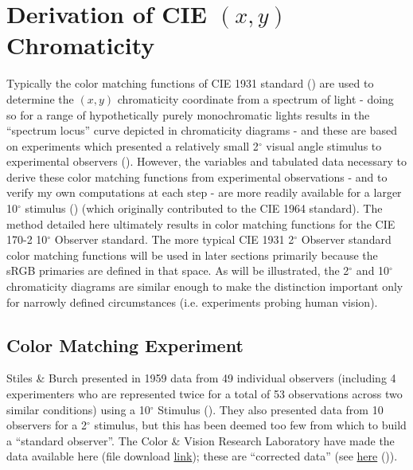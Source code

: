 \documentclass{article}
\begin{document}

\section{Derivation of CIE $(x,y)$ Chromaticity} \label{sec:derivation}

\begin{multicols}{2}


Typically the color matching functions of CIE 1931 standard (\cite{cie1932commission}) are used to determine the $(x,y)$ chromaticity coordinate from a spectrum of light - doing so for a range of hypothetically purely monochromatic lights results in the “spectrum locus” curve depicted in chromaticity diagrams - and these are based on experiments which presented a relatively small 2$^\circ$ visual angle stimulus to experimental observers (\cite{wright1929re,guild1931colorimetric}).  However, the variables and tabulated data necessary to derive these color matching functions from experimental observations - and to verify my own computations at each step - are more readily available for a larger 10$^\circ$ stimulus (\cite{stiles1959npl}) (which originally contributed to the CIE 1964 standard).  The method detailed here ultimately results in color matching functions for the CIE 170-2 10$^\circ$ Observer standard.  The more typical CIE 1931 2$^\circ$ Observer standard color matching functions will be used in later sections primarily because the sRGB primaries are defined in that space.  As will be illustrated, the 2$^\circ$ and 10$^\circ$ chromaticity diagrams are similar enough to make the distinction important only for narrowly defined circumstances (i.e. experiments probing human vision).

\subsection{Color Matching Experiment} %

Stiles \& Burch presented in 1959 data from 49 individual observers (including 4 experimenters who are represented twice for a total of 53 observations across two similar conditions) using a 10$^\circ$ Stimulus (\cite{stiles1959npl}).  They also presented data from 10 observers for a 2$^\circ$ stimulus, but this has been deemed too few from which to build a “standard observer”.  The Color \& Vision Research Laboratory have made the data available here (file download \href{http://www.cvrl.org/database/data/sb_individual/SB10_corrected_indiv_CMFs.xls}{link}); these are “corrected data” (see \href{http://www.cvrl.org/database/text/sb_individual/sb10_individual.htm}{here} (\cite{stiles1958average})).


\end{multicols}
\end{document}
